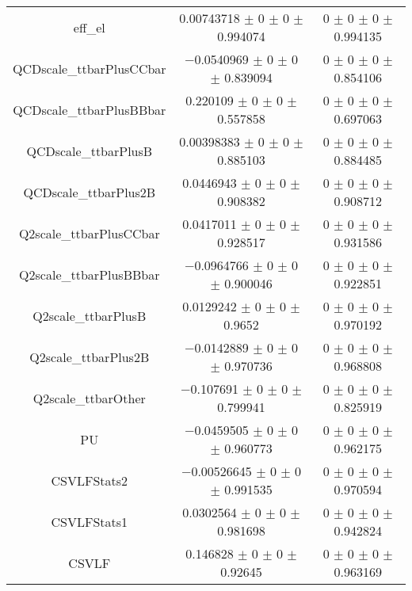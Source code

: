\begin{table}
\begin{tabular}{ccc}
eff\_el 	& \num{0.00743718} $\pm$ \num{0} $\pm$ \num{0} $\pm$ \num{0.994074} 	& \num{0} $\pm$ \num{0} $\pm$ \num{0} $\pm$ \num{0.994135}\\
QCDscale\_ttbarPlusCCbar 	& \num{-0.0540969} $\pm$ \num{0} $\pm$ \num{0} $\pm$ \num{0.839094} 	& \num{0} $\pm$ \num{0} $\pm$ \num{0} $\pm$ \num{0.854106}\\
QCDscale\_ttbarPlusBBbar 	& \num{0.220109} $\pm$ \num{0} $\pm$ \num{0} $\pm$ \num{0.557858} 	& \num{0} $\pm$ \num{0} $\pm$ \num{0} $\pm$ \num{0.697063}\\
QCDscale\_ttbarPlusB 	& \num{0.00398383} $\pm$ \num{0} $\pm$ \num{0} $\pm$ \num{0.885103} 	& \num{0} $\pm$ \num{0} $\pm$ \num{0} $\pm$ \num{0.884485}\\
QCDscale\_ttbarPlus2B 	& \num{0.0446943} $\pm$ \num{0} $\pm$ \num{0} $\pm$ \num{0.908382} 	& \num{0} $\pm$ \num{0} $\pm$ \num{0} $\pm$ \num{0.908712}\\
Q2scale\_ttbarPlusCCbar 	& \num{0.0417011} $\pm$ \num{0} $\pm$ \num{0} $\pm$ \num{0.928517} 	& \num{0} $\pm$ \num{0} $\pm$ \num{0} $\pm$ \num{0.931586}\\
Q2scale\_ttbarPlusBBbar 	& \num{-0.0964766} $\pm$ \num{0} $\pm$ \num{0} $\pm$ \num{0.900046} 	& \num{0} $\pm$ \num{0} $\pm$ \num{0} $\pm$ \num{0.922851}\\
Q2scale\_ttbarPlusB 	& \num{0.0129242} $\pm$ \num{0} $\pm$ \num{0} $\pm$ \num{0.9652} 	& \num{0} $\pm$ \num{0} $\pm$ \num{0} $\pm$ \num{0.970192}\\
Q2scale\_ttbarPlus2B 	& \num{-0.0142889} $\pm$ \num{0} $\pm$ \num{0} $\pm$ \num{0.970736} 	& \num{0} $\pm$ \num{0} $\pm$ \num{0} $\pm$ \num{0.968808}\\
Q2scale\_ttbarOther 	& \num{-0.107691} $\pm$ \num{0} $\pm$ \num{0} $\pm$ \num{0.799941} 	& \num{0} $\pm$ \num{0} $\pm$ \num{0} $\pm$ \num{0.825919}\\
PU 	& \num{-0.0459505} $\pm$ \num{0} $\pm$ \num{0} $\pm$ \num{0.960773} 	& \num{0} $\pm$ \num{0} $\pm$ \num{0} $\pm$ \num{0.962175}\\
CSVLFStats2 	& \num{-0.00526645} $\pm$ \num{0} $\pm$ \num{0} $\pm$ \num{0.991535} 	& \num{0} $\pm$ \num{0} $\pm$ \num{0} $\pm$ \num{0.970594}\\
CSVLFStats1 	& \num{0.0302564} $\pm$ \num{0} $\pm$ \num{0} $\pm$ \num{0.981698} 	& \num{0} $\pm$ \num{0} $\pm$ \num{0} $\pm$ \num{0.942824}\\
CSVLF 	& \num{0.146828} $\pm$ \num{0} $\pm$ \num{0} $\pm$ \num{0.92645} 	& \num{0} $\pm$ \num{0} $\pm$ \num{0} $\pm$ \num{0.963169}\\

\end{tabular}
\end{table}
